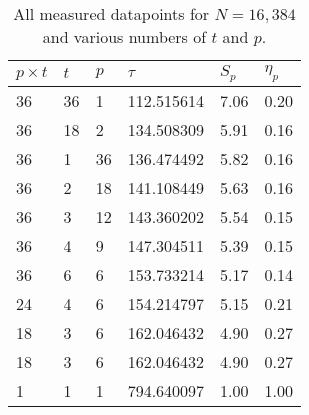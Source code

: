 \begin{table}[H]
  \centering
  \caption{All measured datapoints for $N=16,384$ and various numbers of $t$ and $p$.}
  \label{tab:speedup_all_data}
  \begin{tabularx}{0.9\textwidth}{XXXX|XX}
    \toprule
    $p\times t$ & $t$ & $p$ & $\tau$ & $S_p$ & $\eta_p$ \\
    \midrule
    36  & 36  & 1   & 112.515614  &  7.06  &  0.20  \\
    36  & 18  & 2   & 134.508309  &  5.91  &  0.16  \\
    36  & 1   & 36  & 136.474492  &  5.82  &  0.16  \\
    36  & 2   & 18  & 141.108449  &  5.63  &  0.16  \\
    36  & 3   & 12  & 143.360202  &  5.54  &  0.15  \\
    36  & 4   & 9   & 147.304511  &  5.39  &  0.15  \\
    36  & 6   & 6   & 153.733214  &  5.17  &  0.14  \\
    24  & 4   & 6   & 154.214797  &  5.15  &  0.21  \\
    18  & 3   & 6   & 162.046432  &  4.90  &  0.27  \\
    18  & 3   & 6   & 162.046432  &  4.90  &  0.27  \\
    1   & 1   & 1   & 794.640097  &  1.00  &  1.00  \\
    \bottomrule
  \end{tabularx}
\end{table}

